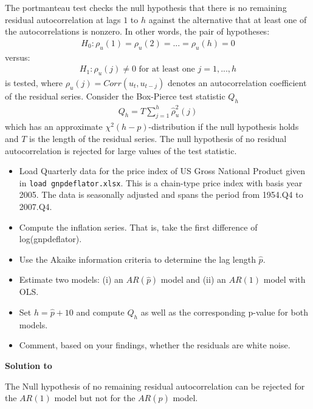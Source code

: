The portmanteau test checks the null hypothesis that there is no remaining residual autocorrelation at lags $1$ to $h$ against the alternative that at least one of the autocorrelations is nonzero. In other words, the pair of hypotheses:
\begin{align*}
    H_0:\rho_u(1)=\rho_u(2)=...=\rho_u(h) = 0
\end{align*}
versus:
\begin{align*}
    H_1:\rho_u(j)\neq 0 \text{ for at least one }j=1,...,h
\end{align*}
is tested, where $\rho_u(j) = Corr(u_t, u_{t-j})$ denotes an autocorrelation coefficient of
the residual series. Consider the Box-Pierce test statistic $Q_h$
\begin{align*}
    Q_h = T \sum_{j=1}^h \hat{\rho}^2_u(j)
\end{align*}
which has an approximate $\chi^2(h-p)$-distribution if the null hypothesis holds and $T$ is the length of the residual series. The null hypothesis of no residual autocorrelation is rejected for large values of the test statistic.

\begin{itemize}
    \item Load Quarterly data for the price index of US Gross National Product given in \texttt{load gnpdeflator.xlsx}. This is a chain-type price index with basis year 2005. The data is seasonally adjusted and spans the period from 1954.Q4 to 2007.Q4.
    \item Compute the inflation series. That is, take the first difference of log(gnpdeflator).
    \item Use the Akaike information criteria to determine the lag length $\hat{p}$.
    \item Estimate two models: (i) an $AR(\hat{p})$ model and (ii) an $AR(1)$ model with OLS.
    \item Set $h=\hat{p}+10$ and compute $Q_h$ as well as the corresponding p-value for both models.
    \item Comment, based on your findings, whether the residuals are white noise.
\end{itemize}
\begin{solution}\textbf{Solution to }
    
    The Null hypothesis of no remaining residual autocorrelation can be rejected for the $AR(1)$ model but not for the $AR(\hat{p})$ model.
\end{solution}
